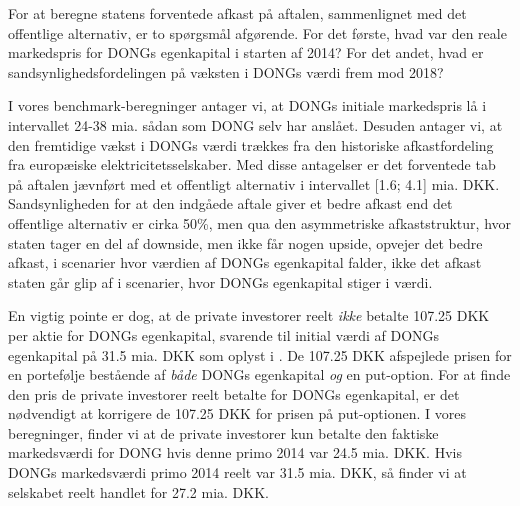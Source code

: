 \documentclass{article}
\begin{document}
For at beregne statens forventede afkast på aftalen, sammenlignet med det offentlige alternativ, er to spørgsmål afgørende. For det første, hvad var den reale markedspris for DONGs egenkapital i starten af 2014? For det andet, hvad er sandsynlighedsfordelingen på væksten i DONGs værdi frem mod 2018? 

I vores benchmark-beregninger antager vi, at DONGs initiale markedspris lå i intervallet 24-38 mia. sådan som DONG selv har anslået. Desuden antager vi, at den fremtidige vækst i DONGs værdi trækkes fra den historiske afkastfordeling fra europæiske elektricitetsselskaber. Med disse antagelser er det forventede tab på aftalen jævnført med et offentligt alternativ i intervallet [1.6; 4.1] mia. DKK. Sandsynligheden for at den indgåede aftale giver et bedre afkast end det offentlige alternativ er cirka 50\%, men qua den asymmetriske afkaststruktur, hvor staten tager en del af downside, men ikke får nogen upside, opvejer det bedre afkast, i scenarier hvor værdien af DONGs egenkapital falder, ikke det afkast staten går glip af i  scenarier, hvor DONGs egenkapital stiger i værdi.


En vigtig pointe er dog, at de private investorer reelt \emph{ikke} betalte 107.25 DKK per aktie for DONGs egenkapital, svarende til initial værdi af DONGs egenkapital på 31.5 mia. DKK som oplyst i  \cite{FM2013a}. De 107.25 DKK afspejlede prisen for en portefølje bestående af \emph{både} DONGs egenkapital \emph{og} en put-option. For at finde den pris de private investorer reelt betalte for DONGs egenkapital, er det nødvendigt at korrigere de 107.25 DKK for prisen på put-optionen. I vores beregninger, finder vi at de private investorer kun betalte den faktiske markedsværdi for DONG hvis denne primo 2014 var 24.5 mia. DKK. Hvis DONGs markedsværdi primo 2014 reelt var 31.5 mia. DKK, så finder vi at selskabet reelt handlet for 27.2 mia. DKK.
\end{document}
